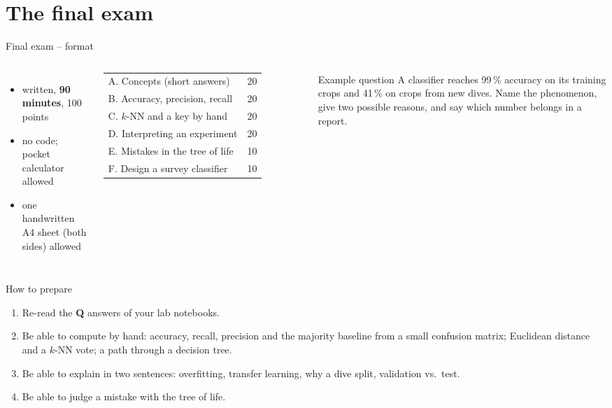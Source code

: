 \documentclass[aspectratio=169,11pt]{beamer}
\begin{document}
\section{The final exam}

\begin{frame}{Final exam -- format}
\begin{columns}[T]
\begin{itemize}\small
  \item written, \textbf{90 minutes}, 100 points
  \item no code; pocket calculator allowed
  \item one handwritten A4 sheet (both sides) allowed
\end{itemize}
\vspace{4pt}
\small
\begin{tabular}{@{}lr@{}}
\toprule
A. Concepts (short answers) & 20 \\
B. Accuracy, precision, recall & 20 \\
C. $k$-NN and a key by hand & 20 \\
D. Interpreting an experiment & 20 \\
E. Mistakes in the tree of life & 10 \\
F. Design a survey classifier & 10 \\
\bottomrule
\end{tabular}
\begin{block}{Example question}
\small A classifier reaches 99\,\% accuracy on its training crops and 41\,\% on crops from new dives.
Name the phenomenon, give two possible reasons, and say which number belongs in a report.
\end{block}
\end{columns}
\end{frame}

\begin{frame}{How to prepare}
\begin{enumerate}
  \item Re-read the \textbf{\color{coral}Q} answers of your lab notebooks.
  \item Be able to compute by hand: accuracy, recall, precision and the majority baseline from a small confusion matrix; Euclidean distance and a $k$-NN vote; a path through a decision tree.
  \item Be able to explain in two sentences: overfitting, transfer learning, why a dive split, validation vs.\ test.
  \item Be able to judge a mistake with the tree of life.
\end{enumerate}
\end{frame}
\end{document}
